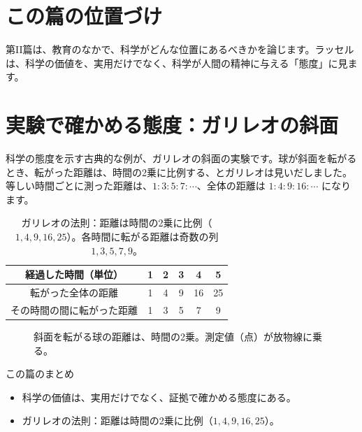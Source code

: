 \documentclass[a4paper,11pt,openany]{ltjsbook}
\begin{document}
\section{この篇の位置づけ}

第II篇は、教育のなかで、科学がどんな位置にあるべきかを論じます。ラッセルは、科学の価値を、実用だけでなく、科学が人間の精神に与える「態度」に見ます。

\section{実験で確かめる態度：ガリレオの斜面}

科学の態度を示す古典的な例が、ガリレオの斜面の実験です。球が斜面を転がるとき、転がった距離は、時間の2乗に比例する、とガリレオは見いだしました。等しい時間ごとに測った距離は、$1:3:5:7:\cdots$、全体の距離は $1:4:9:16:\cdots$ になります。

\begin{table}[htbp]
\centering
\begin{tabular}{c|ccccc}
\toprule
経過した時間（単位） & 1 & 2 & 3 & 4 & 5\\
\midrule
転がった全体の距離 & 1 & 4 & 9 & 16 & 25\\
その時間の間に転がった距離 & 1 & 3 & 5 & 7 & 9\\
\bottomrule
\end{tabular}
\caption{ガリレオの法則：距離は時間の2乗に比例（$1,4,9,16,25$）。各時間に転がる距離は奇数の列 $1,3,5,7,9$。}
\end{table}

\begin{figure}[htbp]
\centering
{}
\caption{斜面を転がる球の距離は、時間の2乗。測定値（点）が放物線に乗る。}
\end{figure}

\begin{pointbox}{この篇のまとめ}
\begin{itemize}[leftmargin=*]
\item 科学の価値は、実用だけでなく、証拠で確かめる態度にある。
\item ガリレオの法則：距離は時間の2乗に比例（$1,4,9,16,25$）。
\end{itemize}
\end{pointbox}
\end{document}
